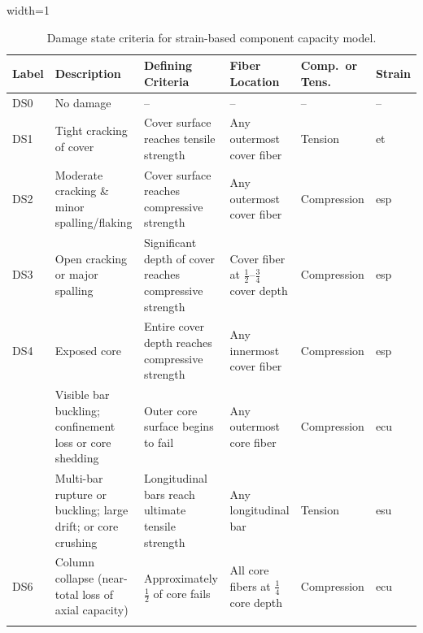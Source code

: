 \begin{table}[H]
\centering
\caption{Damage state criteria for strain-based component capacity model.}
\begin{adjustbox}{width=1\textwidth}
\renewcommand{\arraystretch}{1.4}
\begin{tabular}{>{\centering\arraybackslash}m{1.2cm}
                 m{4.2cm}
                 m{5.2cm}
                 m{3.4cm}
                 >{\centering\arraybackslash}m{2.4cm}
                 >{\centering\arraybackslash}m{1.4cm}}

\toprule
\textbf{Label} &
\textbf{Description} &
\textbf{Defining Criteria} &
\textbf{Fiber Location} &
\textbf{Comp.\ or Tens.} &
\textbf{Strain} \\
\midrule
\addlinespace[4pt]

DS0 & No damage & -- & -- & -- & -- \\
\addlinespace[8pt]

DS1 & Tight cracking of cover &
  Cover surface reaches tensile strength &
  Any outermost cover fiber & Tension & \gls{et} \\
\addlinespace[8pt]

DS2 & Moderate cracking \& minor spalling/flaking &
  Cover surface reaches compressive strength &
  Any outermost cover fiber & Compression & \gls{esp} \\
\addlinespace[8pt]

DS3 & Open cracking or major spalling &
  Significant depth of cover reaches compressive strength &
  Cover fiber at $\tfrac{1}{2}$--$\tfrac{3}{4}$ cover depth & Compression & \gls{esp} \\
\addlinespace[8pt]

DS4 & Exposed core &
  Entire cover depth reaches compressive strength &
  Any innermost cover fiber & Compression & \gls{esp} \\
\addlinespace[8pt]

\multirow{2}{*}{DS5} &
  Visible bar buckling; confinement loss or core shedding &
  Outer core surface begins to fail &
  Any outermost core fiber & Compression & \gls{ecu} \\[6pt]
& Multi-bar rupture or buckling; large drift; or core crushing &
  Longitudinal bars reach ultimate tensile strength &
  Any longitudinal bar & Tension & \gls{esu} \\
\addlinespace[8pt]

DS6 & Column collapse (near-total loss of axial capacity) &
  Approximately $\tfrac{1}{2}$ of core fails &
  All core fibers at $\tfrac{1}{4}$ core depth & Compression & \gls{ecu} \\
\addlinespace[4pt]

\bottomrule
\end{tabular}
\end{adjustbox}
\label{tab:DS3}
\end{table}

